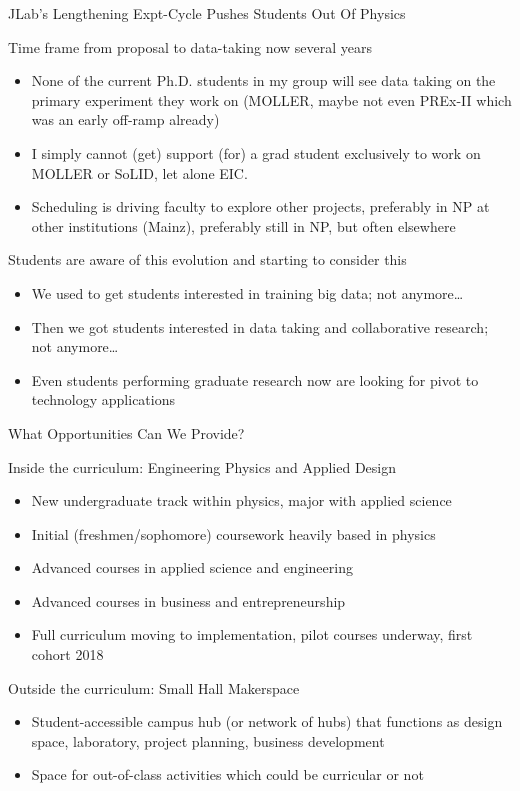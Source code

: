 \documentclass[xcolor={dvipsnames},professionalfonts]{beamer}
\begin{document}
\begin{frame}{JLab's Lengthening Expt-Cycle Pushes Students Out Of Physics}
 \begin{block}{Time frame from proposal to data-taking now several years}
  \begin{itemize}
   \item None of the current Ph.D. students in my group will see data taking on the primary experiment they work on (MOLLER, maybe not even PREx-II which was an early off-ramp already)
   \item I simply cannot (get) support (for) a grad student exclusively to work on MOLLER or SoLID, let alone EIC.
   \item Scheduling is driving faculty to explore other projects, preferably in NP at other institutions (Mainz), preferably still in NP, but often elsewhere
  \end{itemize}
 \end{block}
 \begin{block}{Students are aware of this evolution and starting to consider this}
  \begin{itemize}
   \item We used to get students interested in training big data; not anymore\ldots
   \item Then we got students interested in data taking and collaborative research; not anymore\ldots
   \item Even students performing graduate research now are looking for pivot to technology applications
  \end{itemize}
 \end{block}
\end{frame}

\begin{frame}{What Opportunities Can We Provide?}
 \begin{block}{Inside the curriculum: Engineering Physics and Applied Design}
  \begin{itemize}
   \item New undergraduate track within physics, major with applied science
   \item Initial (freshmen/sophomore) coursework heavily based in physics
   \item Advanced courses in applied science and engineering
   \item Advanced courses in business and entrepreneurship
   \item Full curriculum moving to implementation, pilot courses underway, first cohort 2018
  \end{itemize}
 \end{block}
 \begin{block}{Outside the curriculum: Small Hall Makerspace}
  \begin{itemize}
   \item Student-accessible campus hub (or network of hubs) that functions as design space, laboratory, project planning, business development
   \item Space for out-of-class activities which could be curricular or not
  \end{itemize}
 \end{block}
\end{frame}
\end{document}
